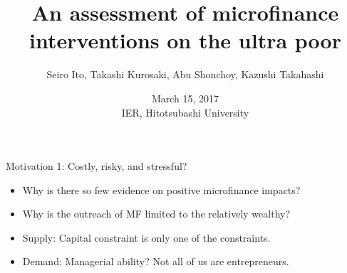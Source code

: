 

%


\newcommand{\mpagec}[2]{\begin{minipage}[c]{#1}#2\end{minipage}}


\setlength{\baselineskip}{12pt}






\title[MF ultra poor]{\large An assessment of microfinance interventions on the ultra poor}
\author[Ito, Kurosaki, Shonchoy, Takahashi]{Seiro Ito, Takashi Kurosaki, Abu Shonchoy, Kazushi Takahashi}
\date[March 15, 2017]{March 15, 2017\\\vspace{1ex} IER, Hitotsubashi University}


\frame{\titlepage}
\setcounter{page}{1}


\begin{frame}[label = background]{}
Motivation 1: Costly, risky, and stressful?
\begin{itemize}
\vspace{1.0ex}\setlength{\itemsep}{3.0ex}\setlength{\baselineskip}{12pt}
\pause
\item	Why is there so few evidence on positive microfinance impacts?
\pause
\item	Why is the outreach of MF limited to the relatively wealthy?
\pause
\item	Supply: Capital constraint is only one of the constraints.
\pause
\item	Demand: Managerial ability? \pause Not all of us are entrepreneurs.
\end{itemize}
\end{frame}

